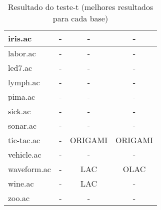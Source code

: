 \begin{table}[htbp]
\begin{tabular}{|l|c|c|c|}
		iris.ac                 & -                     & -                     & -                     \\
		\hline
		labor.ac                & -                     & -                     & -                     \\
		\hline
		led7.ac                 & -                     & -                     & -                     \\
		\hline
		lymph.ac                & -                     & -                     & -                     \\
		\hline
		pima.ac                 & -                     & -                     & -                     \\
		\hline
		sick.ac                 & -                     & -                     & -                     \\
		\hline
		sonar.ac                & -                     & -                     & -                     \\
		\hline
		tic-tac.ac              & -                     & ORIGAMI               & ORIGAMI               \\
		\hline
		vehicle.ac              & -                     & -                     & -                     \\
		\hline
		waveform.ac             & -                     & LAC                   & OLAC                  \\
		\hline
		wine.ac                 & -                     & LAC                   & -                     \\
		\hline
		zoo.ac                  & -                     & -                     & -                     \\
		\hline
		\end{tabular}
	\caption{Resultado do teste-t (melhores resultados para cada base)}
	\label{tab:ttest_best}
\end{table}
